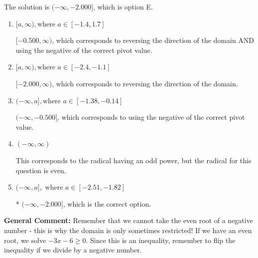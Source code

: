 \documentclass{extbook}[14pt]
\begin{document}
\begin{enumerate}
{The solution is \( (-\infty, -2.000] \), which is option E.\begin{enumerate}[label=\Alph*.]
\item \( [a, \infty), \text{where } a \in [-1.4, 1.7] \)

$[-0.500, \infty)$, which corresponds to reversing the direction of the domain AND using the negative of the correct pivot value.
\item \( [a, \infty), \text{where } a \in [-2.4, -1.1] \)

 $[-2.000, \infty)$, which corresponds to reversing the direction of the domain.
\item \( (-\infty, a], \text{where } a \in [-1.38, -0.14] \)

$(-\infty, -0.500]$, which corresponds to using the negative of the correct pivot value.
\item \( (-\infty, \infty) \)

This corresponds to the radical having an odd power, but the radical for this question is even.
\item \( (-\infty, a], \text{ where } a \in [-2.51, -1.82] \)

* $(-\infty, -2.000]$, which is the correct option.
\end{enumerate}

\textbf{General Comment:} Remember that we cannot take the even root of a negative number - this is why the domain is only sometimes restricted! If we have an even root, we solve $-3 x - 6 \geq 0$. Since this is an inequality, remember to flip the inequality if we divide by a negative number.
}
\end{enumerate}
\end{document}
